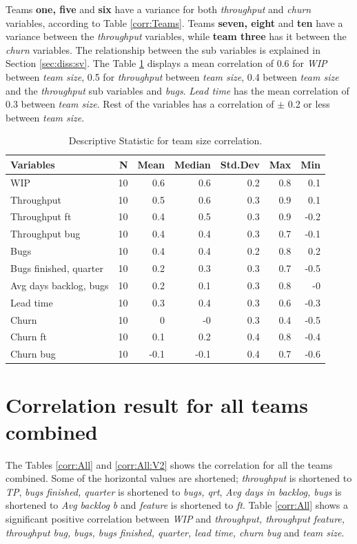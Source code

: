 \documentclass[UKenglish]{ifimaster}  %
\begin{document}
Teams \textbf{one, five} and \textbf{six} have a variance for both \textit{throughput} and \textit{churn} variables, according to Table \ref{corr:Teams}. Teams \textbf{seven, eight} and \textbf{ten} have a variance between the \textit{throughput} variables, while \textbf{team three} has it between the \textit{churn} variables. The relationship between the sub variables is explained in Section \ref{sec:diss:sv}. The Table \ref{DS:corr:TS} displays a mean correlation of 0.6 for  \textit{WIP} between \textit{team size}, 0.5 for \textit{throughput} between \textit{team size}, 0.4 between \textit{team size} and the \textit{throughput} sub variables and \textit{bugs}. \textit{Lead time} has the mean correlation of  0.3 between \textit{team size}. Rest of the variables has a correlation of $\pm$ 0.2 or less between \textit{team size}.

\begin{table}[!htbp]
 \caption{Descriptive Statistic  for team size correlation.}
 \centering
 \begin{tabular}{ | l | r | r | r | r | r | r | }
 \hline
\textbf{Variables}& \bf{N} & \bf{Mean} & \bf{Median} & \bf{Std.Dev} & \bf{Max} & \bf{Min} \\ \hline
WIP  & 10 & 0.6 & 0.6 & 0.2 & 0.8 & 0.1\\ \hline
Throughput  & 10 & 0.5 & 0.6 & 0.3 & 0.9 & 0.1\\ \hline
Throughput ft  & 10 & 0.4 & 0.5 & 0.3 & 0.9 & -0.2\\ \hline
Throughput bug  & 10 & 0.4 & 0.4 & 0.3 & 0.7 & -0.1\\ \hline
Bugs  & 10 & 0.4 & 0.4 & 0.2 & 0.8 & 0.2\\ \hline
Bugs finished, quarter  & 10 & 0.2 & 0.3 & 0.3 & 0.7 & -0.5\\ \hline
Avg days backlog, bugs  & 10 & 0.2 & 0.1 & 0.3 & 0.8 & -0\\ \hline
Lead time & 10 & 0.3 & 0.4 & 0.3 & 0.6 & -0.3\\ \hline
Churn  & 10 & 0 & -0 & 0.3 & 0.4 & -0.5\\ \hline
Churn ft  & 10 & 0.1 & 0.2 & 0.4 & 0.8 & -0.4\\ \hline
Churn bug  & 10 & -0.1 & -0.1 & 0.4 & 0.7 & -0.6\\ \hline
\end{tabular}
 \label{DS:corr:TS}
 \end{table}
  

\section{Correlation result for all teams combined}
\label{sec:corr:alc}
The Tables \ref{corr:All} and \ref{corr:All:V2} shows the correlation for all the teams combined. Some of the horizontal values are shortened; \textit{throughput} is shortened to \textit{TP}, \textit{bugs finished, quarter} is shortened to \textit{bugs, qrt},  \textit{Avg days in backlog, bugs} is shortened to \textit{Avg backlog b} and \textit{feature} is shortened to \textit{ft}. Table \ref{corr:All} shows a significant positive correlation between \textit{WIP} and \textit{throughput, throughput feature, throughput bug, bugs, bugs finished, quarter, lead time, churn bug} and \textit{team size}.
\end{document}
